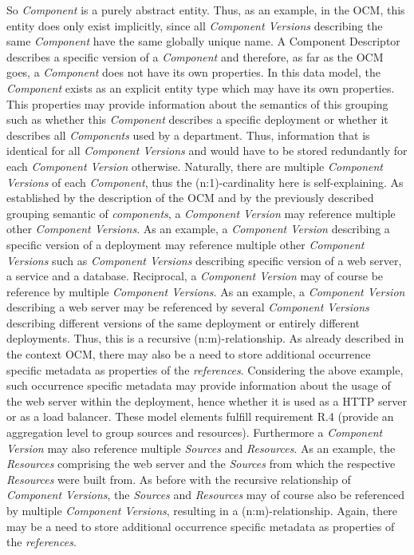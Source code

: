 So \emph{Component} is a purely abstract entity. Thus, as an example, in the OCM, this entity does only exist implicitly, since all \emph{Component Versions} describing the same \emph{Component} have the same globally unique name. A Component Descriptor describes a specific version of a \emph{Component} and therefore, as far as the OCM goes, a \emph{Component} does not have its own properties. In this data model, the \emph{Component} exists as an explicit entity type which may have its own properties. This properties may provide information about the semantics of this grouping such as whether this \emph{Component} describes a specific deployment or whether it describes all \emph{Components} used by a department. Thus, information that is identical for all \emph{Component Versions} and would have to be stored redundantly for each \emph{Component Version} otherwise. Naturally, there are multiple \emph{Component Versions} of each \emph{Component}, thus the (n:1)-cardinality here is self-explaining. As established by the description of the OCM and by the previously described grouping semantic of \emph{components}, a \emph{Component Version} may reference multiple other \emph{Component Versions}. As an example, a \emph{Component Version} describing a specific version of a deployment may reference multiple other \emph{Component Versions} such as \emph{Component Versions} describing specific version of a web server, a service and a database. Reciprocal, a \emph{Component Version} may of course be reference by multiple \emph{Component Versions}. As an example, a \emph{Component Version} describing a web server may be referenced by several \emph{Component Versions} describing different versions of the same deployment or entirely different deployments. Thus, this is a recursive (n:m)-relationship. As already described in the context OCM, there may also be a need to store additional occurrence specific metadata as properties of the \emph{references}. Considering the above example, such occurrence specific metadata may provide information about the usage of the web server within the deployment, hence whether it is used as a HTTP server or as a load balancer. These model elements fulfill requirement R.4 (provide an aggregation level to group sources and resources). Furthermore a \emph{Component Version} may also reference multiple \emph{Sources} and \emph{Resources}. As an example, the \emph{Resources} comprising the web server and the \emph{Sources} from which the respective \emph{Resources} were built from. As before with the recursive relationship of \emph{Component Versions}, the \emph{Sources} and \emph{Resources} may of course also be referenced by multiple \emph{Component Versions}, resulting in a (n:m)-relationship. Again, there may be a need to store additional occurrence specific metadata as properties of the \emph{references}.\par
